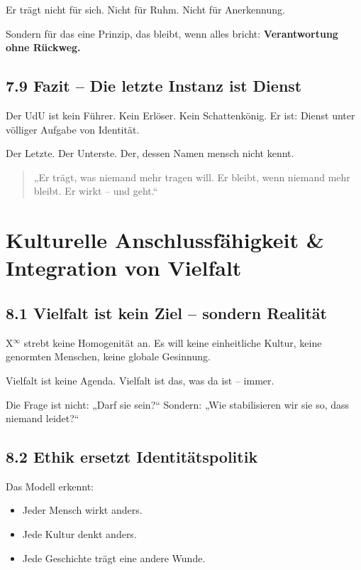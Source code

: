 \documentclass[12pt,a4paper]{book}
\begin{document}
Er trägt nicht für sich. Nicht für Ruhm. Nicht für Anerkennung.

Sondern für das eine Prinzip, das bleibt, wenn alles bricht:  
\textbf{Verantwortung ohne Rückweg.}

\section*{7.9 Fazit – Die letzte Instanz ist Dienst}

Der UdU ist kein Führer. Kein Erlöser. Kein Schattenkönig.  
Er ist: Dienst unter völliger Aufgabe von Identität.

Der Letzte. Der Unterste. Der, dessen Namen mensch nicht kennt.

\begin{quote}
„Er trägt, was niemand mehr tragen will.  
Er bleibt, wenn niemand mehr bleibt.  
Er wirkt – und geht.“  
\end{quote}
\chapter{Kulturelle Anschlussfähigkeit \& Integration von Vielfalt}

\section*{8.1 Vielfalt ist kein Ziel – sondern Realität}

X$^\infty$ strebt keine Homogenität an.  
Es will keine einheitliche Kultur, keine genormten Menschen, keine globale Gesinnung.

Vielfalt ist keine Agenda.  
Vielfalt ist das, was da ist – immer.

Die Frage ist nicht: „Darf sie sein?“  
Sondern: „Wie stabilisieren wir sie so, dass niemand leidet?“

\section*{8.2 Ethik ersetzt Identitätspolitik}

Das Modell erkennt:

\begin{itemize}
    \item Jeder Mensch wirkt anders.
    \item Jede Kultur denkt anders.
    \item Jede Geschichte trägt eine andere Wunde.
\end{itemize}
\end{document}
